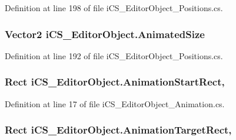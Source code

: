 Definition at line 198 of file i\+C\+S\+\_\+\+Editor\+Object\+\_\+\+Positions.\+cs.

\hypertarget{classi_c_s___editor_object_ae4d568361befcb6e73a46bd31cfde1ad}{
\subsubsection[{Animated\+Size}]{\setlength{\rightskip}{0pt plus 5cm}Vector2 i\+C\+S\+\_\+\+Editor\+Object.\+Animated\+Size\hspace{0.3cm}{\ttfamily [get]}}}\label{classi_c_s___editor_object_ae4d568361befcb6e73a46bd31cfde1ad}


Definition at line 192 of file i\+C\+S\+\_\+\+Editor\+Object\+\_\+\+Positions.\+cs.

\hypertarget{classi_c_s___editor_object_a4b016005a40ed24f197610d9cc5233eb}{
\subsubsection[{Animation\+Start\+Rect}]{\setlength{\rightskip}{0pt plus 5cm}Rect i\+C\+S\+\_\+\+Editor\+Object.\+Animation\+Start\+Rect\hspace{0.3cm}{\ttfamily [get]}, {\ttfamily [set]}}}\label{classi_c_s___editor_object_a4b016005a40ed24f197610d9cc5233eb}


Definition at line 17 of file i\+C\+S\+\_\+\+Editor\+Object\+\_\+\+Animation.\+cs.

\hypertarget{classi_c_s___editor_object_a947a83ffee905885ddf26431a31340dc}{
\subsubsection[{Animation\+Target\+Rect}]{\setlength{\rightskip}{0pt plus 5cm}Rect i\+C\+S\+\_\+\+Editor\+Object.\+Animation\+Target\+Rect\hspace{0.3cm}{\ttfamily [get]}, {\ttfamily [set]}}}\label{classi_c_s___editor_object_a947a83ffee905885ddf26431a31340dc}



